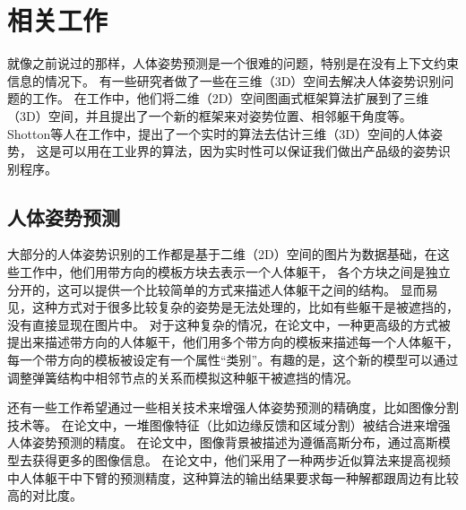 
\chapter{相关工作}
\label{chap:related}
就像之前说过的那样，人体姿势预测是一个很难的问题，特别是在没有上下文约束信息的情况下。
有一些研究者做了一些在三维（3D）空间去解决人体姿势识别问题的工作\cite{burenius20133d,ics14cvpr}。
在工作\cite{burenius20133d}中，他们将二维（2D）空间图画式框架算法\cite{ps1,ps2}扩展到了三维（3D）空间，并且提出了一个新的框架来对姿势位置、相邻躯干角度等。
Shotton等人在工作\cite{shotton2013real}中，提出了一个实时的算法去估计三维（3D）空间的人体姿势，
这是可以用在工业界的算法，因为实时性可以保证我们做出产品级的姿势识别程序。

\section{人体姿势预测}
大部分的人体姿势识别的工作都是基于二维（2D）空间的图片为数据基础，在这些工作中，他们用带方向的模板方块去表示一个人体躯干，
各个方块之间是独立分开的，这可以提供一个比较简单的方式来描述人体躯干之间的结构。
显而易见，这种方式对于很多比较复杂的姿势是无法处理的\cite{nips06,cvpr10,Daniel}，比如有些躯干是被遮挡的，没有直接显现在图片中。
对于这种复杂的情况，在论文\cite{deva11}中，一种更高级的方式被提出来描述带方向的人体躯干，他们用多个带方向的模板来描述每一个人体躯干，
每一个带方向的模板被设定有一个属性“类别”。有趣的是，这个新的模型可以通过调整弹簧结构中相邻节点的关系而模拟这种躯干被遮挡的情况。

还有一些工作希望通过一些相关技术来增强人体姿势预测的精确度，比如图像分割技术等。
在论文\cite{eccv10}中，一堆图像特征（比如边缘反馈和区域分割）被结合进来增强人体姿势预测的精度。
在论文\cite{songchun}中，图像背景被描述为遵循高斯分布，通过高斯模型去获得更多的图像信息。
在论文\cite{mixing}中，他们采用了一种两步近似算法来提高视频中人体躯干中下臂的预测精度，这种算法的输出结果要求每一种解都跟周边有比较高的对比度。

